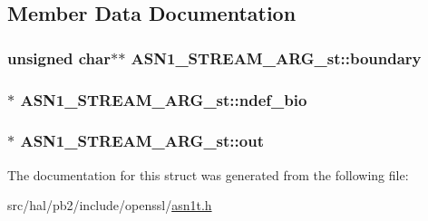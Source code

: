 \subsection{Member Data Documentation}
\subsubsection[{\texorpdfstring{boundary}{boundary}}]{\setlength{\rightskip}{0pt plus 5cm}unsigned char$\ast$$\ast$ A\+S\+N1\+\_\+\+S\+T\+R\+E\+A\+M\+\_\+\+A\+R\+G\+\_\+st\+::boundary}\hypertarget{struct_a_s_n1___s_t_r_e_a_m___a_r_g__st_af36de93a0bc727a033a9db57238e4161}{}\label{struct_a_s_n1___s_t_r_e_a_m___a_r_g__st_af36de93a0bc727a033a9db57238e4161}
\subsubsection[{\texorpdfstring{ndef\+\_\+bio}{ndef_bio}}]{$\ast$ A\+S\+N1\+\_\+\+S\+T\+R\+E\+A\+M\+\_\+\+A\+R\+G\+\_\+st\+::ndef\+\_\+bio}\hypertarget{struct_a_s_n1___s_t_r_e_a_m___a_r_g__st_a3008dd662b50834af241f3f674578e8a}{}\label{struct_a_s_n1___s_t_r_e_a_m___a_r_g__st_a3008dd662b50834af241f3f674578e8a}
\subsubsection[{\texorpdfstring{out}{out}}]{$\ast$ A\+S\+N1\+\_\+\+S\+T\+R\+E\+A\+M\+\_\+\+A\+R\+G\+\_\+st\+::out}\hypertarget{struct_a_s_n1___s_t_r_e_a_m___a_r_g__st_ac35c1f4f1baf2ecf2e38d6586fe313d1}{}\label{struct_a_s_n1___s_t_r_e_a_m___a_r_g__st_ac35c1f4f1baf2ecf2e38d6586fe313d1}


The documentation for this struct was generated from the following file\+:\begin{DoxyCompactItemize}
\item 
src/hal/pb2/include/openssl/\hyperlink{asn1t_8h}{asn1t.\+h}\end{DoxyCompactItemize}
